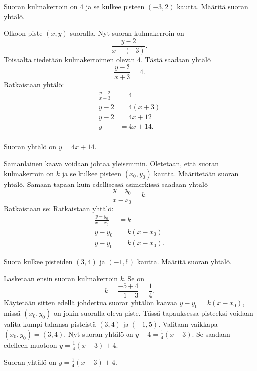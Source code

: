 \begin{esimerkki}
Suoran kulmakerroin on $4$ ja se kulkee pisteen $(-3,2)$ kautta. Määritä suoran yhtälö.

\begin{esimratk}
Olkoon piste $(x,y)$ suoralla. Nyt suoran kulmakerroin on 
\[
\frac{y-2}{x-(-3)}.
\]
Toisaalta tiedetään kulmakertoimen olevan 4. Tästä saadaan yhtälö
\[
\frac{y-2}{x+3}=4.
\]
Ratkaistaan yhtälö:
\begin{align*}
\frac{y-2}{x+3}&=4 \\
y-2&=4(x+3) \\
y-2&=4x+12 \\
y&=4x+14. \\
\end{align*}
\end{esimratk}

\begin{esimvast}
Suoran yhtälö on $y=4x+14$.
\end{esimvast}
\end{esimerkki}

Samanlainen kaava voidaan johtaa yleisemmin. Oletetaan, että suoran kulmakerroin on $k$ ja se kulkee pisteen $(x_0,y_0)$ kautta. Määritetään suoran yhtälö.
Samaan tapaan kuin edellisessä esimerkissä saadaan yhtälö
\[
\frac{y-y_0}{x-x_0}=k.
\]
Ratkaistaan se:
Ratkaistaan yhtälö:
\begin{align*}
\frac{y-y_0}{x-x_0}&=k \\
y-y_0&=k(x-x_0) \\
y-y_0&=k(x-x_0).
\end{align*}


\begin{esimerkki}
Suora kulkee pisteiden $(3,4)$ ja $(-1,5)$ kautta. Määritä suoran yhtälö.

\begin{esimratk}
Lasketaan ensin suoran kulmakerroin $k$. Se on
\[
k=\frac{-5+4}{-1-3}=\frac{1}{4}.
\]
Käytetään sitten edellä johdettua suoran yhtälön kaavaa $y-y_0=k(x-x_0)$, missä $(x_0,y_0)$ on jokin suoralla oleva piste. Tässä tapauksessa pisteeksi voidaan valita kumpi tahansa pisteistä $(3,4)$ ja $(-1,5)$.
Valitaan vaikkapa $(x_0,y_0)=(3,4)$. Nyt suoran yhtälö on $y-4=\frac{1}{4}(x-3)$. Se saadaan edelleen muotoon $y=\frac{1}{4}(x-3)+4$.
\end{esimratk}
\begin{esimvast}
Suoran yhtälö on $y=\frac{1}{4}(x-3)+4$.
\end{esimvast}
\end{esimerkki}


